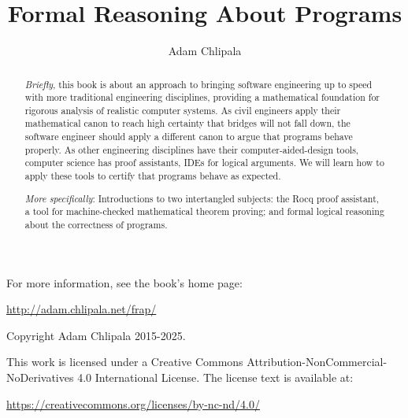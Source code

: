 \documentclass{amsbook}
\theoremstyle{definition}
\theoremstyle{remark}
\numberwithin{section}{chapter}
\numberwithin{equation}{chapter}
\begin{document}
\frontmatter

\title{Formal Reasoning About Programs}

\author{Adam Chlipala}
\address{MIT, Cambridge, MA, USA}

\begin{abstract}
  \emph{Briefly}, this book is about an approach to bringing software engineering up to speed with more traditional engineering disciplines, providing a mathematical foundation for rigorous analysis of realistic computer systems. As civil engineers apply their mathematical canon to reach high certainty that bridges will not fall down, the software engineer should apply a different canon to argue that programs behave properly. As other engineering disciplines have their computer-aided-design tools, computer science has proof assistants, IDEs for logical arguments. We will learn how to apply these tools to certify that programs behave as expected.

  \emph{More specifically}: Introductions to two intertangled subjects: the Rocq proof assistant, a tool for machine-checked mathematical theorem proving; and formal logical reasoning about the correctness of programs.
\end{abstract}

\maketitle

\newpage

For more information, see the book's home page:

\begin{center} \url{http://adam.chlipala.net/frap/} \end{center}

\thispagestyle{empty}
\mbox{}\vfill
\begin{center}

Copyright Adam Chlipala 2015-2025.


This work is licensed under a
Creative Commons Attribution-NonCommercial-NoDerivatives 4.0 International License.
The license text is available at:

\end{center}

\begin{center} \url{https://creativecommons.org/licenses/by-nc-nd/4.0/} \end{center}

\newpage
\end{document}
